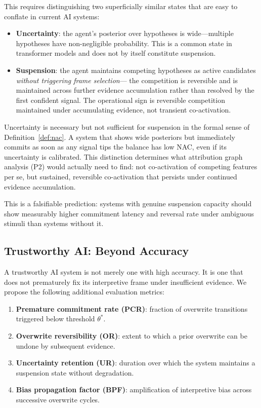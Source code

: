 \documentclass[12pt]{article}
\begin{document}
This requires distinguishing two superficially similar states that
are easy to conflate in current AI systems:

\begin{itemize}
  \item \textbf{Uncertainty}: the agent's posterior over hypotheses is
  wide---multiple hypotheses have non-negligible probability.
  This is a common state in transformer models and does not by itself
  constitute suspension.
  \item \textbf{Suspension}: the agent maintains competing hypotheses
  as active candidates \emph{without triggering frame selection}---
  the competition is reversible and is maintained across further
  evidence accumulation rather than resolved by the first confident
  signal.
  The operational sign is reversible competition maintained under
  accumulating evidence, not transient co-activation.
\end{itemize}

Uncertainty is necessary but not sufficient for suspension in the
formal sense of Definition~\ref{def:nac}.
A system that shows wide posteriors but immediately commits as soon as
any signal tips the balance has low NAC, even if its uncertainty is
calibrated.
This distinction determines what attribution graph analysis (P2) would
actually need to find: not co-activation of competing features per se,
but sustained, reversible co-activation that persists under continued
evidence accumulation.

This is a falsifiable prediction: systems with genuine suspension
capacity should show measurably higher commitment latency and reversal
rate under ambiguous stimuli than systems without it.

\subsection{Trustworthy AI: Beyond Accuracy}

A trustworthy AI system is not merely one with high accuracy.
It is one that does not prematurely fix its interpretive frame under
insufficient evidence.
We propose the following additional evaluation metrics:

\begin{enumerate}
  \item \textbf{Premature commitment rate (PCR)}: fraction of overwrite
        transitions triggered below threshold $\theta^*$.
  \item \textbf{Overwrite reversibility (OR)}: extent to which a prior
        overwrite can be undone by subsequent evidence.
  \item \textbf{Uncertainty retention (UR)}: duration over which the
        system maintains a suspension state without degradation.
  \item \textbf{Bias propagation factor (BPF)}: amplification of
        interpretive bias across successive overwrite cycles.
\end{enumerate}
\end{document}
